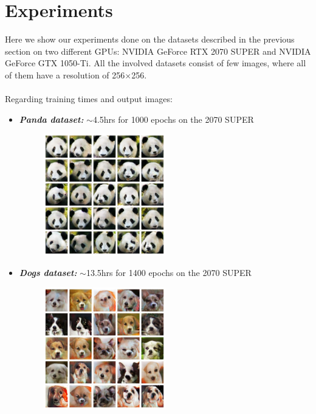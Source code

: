\documentclass[12pt]{article}
\begin{document}
\section{Experiments}
\large
Here we show our experiments done on the datasets described in the previous section on two different
GPUs: NVIDIA GeForce RTX 2070 SUPER and NVIDIA GeForce GTX 1050-Ti. All the involved datasets consist 
of few images, where all of them have a resolution of 256$\times$256.\\\\
Regarding training times and output images:
\begin{itemize}
	\item {			 
		\textbf{\textit{Panda dataset:}} $\sim$4.5hrs for 1000 epochs on the 2070 SUPER
		\begin{figure}[H]
			\centering
			\includegraphics[width=0.5\textwidth]{Images/panda_exp.jpg}
		\end{figure}
	}
	\item {
		\textbf{\textit{Dogs dataset:}} $\sim$13.5hrs for 1400 epochs on the 2070 SUPER
		\begin{figure}[H]
			\centering
			\includegraphics[width=0.5\textwidth]{Images/dogs_exp.jpg}
		\end{figure}
	}

\end{itemize}
\end{document}
